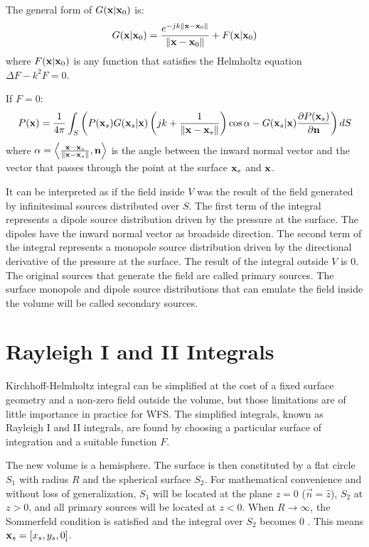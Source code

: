The general form of $G(\PosTheo \vert \PosTheo_0)$ is:
\begin{equation}
G(\PosTheo \vert \PosTheo_0) = \GreenFunc[\PosTheo - \PosTheo_0] + F(\PosTheo \vert \PosTheo_0)
\label{GreensFunction}
\end{equation}
where $F(\PosTheo \vert \PosTheo_0)$ is any function that satisfies the Helmholtz equation $\Delta F - k^2 F = 0$.

If $F = 0$:
\begin{equation}
P(\PosTheo) = \frac{1}{4\pi} \int_{S} \left(P(\PosTheo[surface]) G(\PosTheo[surface] \vert \PosTheo)\left(jk + \frac{1}{\norm{\PosTheo - \PosTheo[surface]}}\right)\cos\normSecondPropAngle - G(\PosTheo[surface] \vert \PosTheo) \frac{\partial P(\PosTheo[surface])}{\partial \mathbf{n}} \right) dS
\end{equation}
where $\normSecondPropAngle = \left\langle \frac{\PosTheo - \PosTheo[surface]}{\norm{\PosTheo - \PosTheo[surface]}} , \vec{n} \right\rangle$ is the angle between the inward normal vector and the vector that passes through the point at the surface $\PosTheo[surface]$ and $\PosTheo$.

It can be interpreted as if the field inside $V$ was the result of the field generated by infinitesimal sources distributed over $S$. The first term of the integral represents a dipole source distribution driven by the pressure at the surface. The dipoles have the inward normal vector as broadside direction. The second term of the integral represents a monopole source distribution driven by the directional derivative of the pressure at the surface. The result of the integral outside $V$ is $0$. The original sources that generate the field are called primary sources. The surface monopole and dipole source distributions that can emulate the field inside the volume will be called secondary sources.

\section{Rayleigh I and II Integrals}
Kirchhoff-Helmholtz integral can be simplified at the cost of a fixed surface geometry and a non-zero field outside the volume, but those limitations are of little importance in practice for WFS. The simplified integrals, known as Rayleigh I and II integrals, are found by choosing a particular surface of integration and a suitable function $F$.

The new volume is a hemisphere. The surface is then constituted by a flat circle $S_1$ with radius $R$ and the spherical surface $S_2$. For mathematical convenience and without loss of generalization, $S_1$ will be located at the plane $z=0$ ($\vec{n} = \hat{z}$), $S_2$ at $z>0$, and all primary sources will be located at $z<0$. When $R\rightarrow\infty$, the Sommerfeld condition is satisfied and the integral over $S_2$ becomes $0$ \cite{Verheijen}. This means $\PosTheo[surface] = [x_s, y_s, 0]$.

